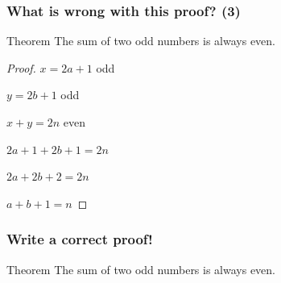 \documentclass[14pt]{beamer}
\begin{document}
\begin{frame}
	\frametitle{What is wrong with this proof? (3)}

	\begin{block}{Theorem}
		The sum of two odd numbers is always even.
	\end{block}


	\begin{proof}
		$\displaystyle x= 2a + 1$ odd

		$\displaystyle y = 2b + 1$ odd

		$\displaystyle x+ y = 2n$ even

		$\displaystyle 2a + 1 + 2b + 1 = 2n$

		$\displaystyle 2a + 2b + 2 = 2n$

		$\displaystyle a + b + 1 = n$
	\end{proof}
\end{frame}

\begin{frame}
	\frametitle{Write a correct proof!}

	\begin{block}{Theorem}
		The sum of two odd numbers is always even.
	\end{block}
\end{frame}
\end{document}
